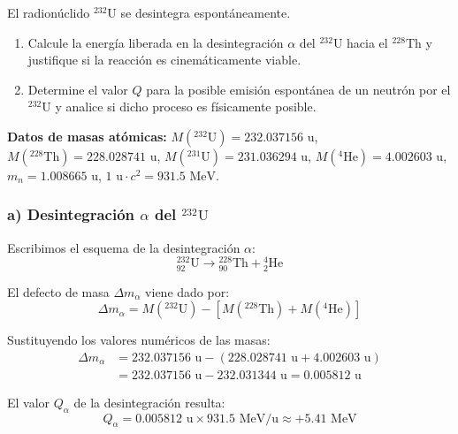 \begin{problema}
El radionúclido ${}^{232}\text{U}$ se desintegra espontáneamente.
\begin{enumerate}[label=\alph*)]
    \item Calcule la energía liberada en la desintegración $\alpha$ del ${}^{232}\text{U}$ hacia el ${}^{228}\text{Th}$ y justifique si la reacción es cinemáticamente viable.
    \item Determine el valor $Q$ para la posible emisión espontánea de un neutrón por el ${}^{232}\text{U}$ y analice si dicho proceso es físicamente posible.
\end{enumerate}

\textbf{Datos de masas atómicas:} $M({}^{232}\text{U}) = 232.037156\text{ u}$, $M({}^{228}\text{Th}) = 228.028741\text{ u}$, $M({}^{231}\text{U}) = 231.036294\text{ u}$, $M({}^4\text{He}) = 4.002603\text{ u}$, $m_n = 1.008665\text{ u}$, $1\text{ u} \cdot c^2 = 931.5\text{ MeV}$.

\tcblower

\subsubsection*{a) Desintegración $\alpha$ del ${}^{232}\text{U}$}

Escribimos el esquema de la desintegración $\alpha$:
\begin{equation}
{}_{92}^{232}\text{U} \longrightarrow {}_{90}^{228}\text{Th} + {}_2^4\text{He}
\end{equation}

El defecto de masa $\Delta m_\alpha$ viene dado por:
\begin{equation}
\Delta m_\alpha = M({}^{232}\text{U}) - \left[ M({}^{228}\text{Th}) + M({}^4\text{He}) \right]
\end{equation}

Sustituyendo los valores numéricos de las masas:
\begin{align}
\Delta m_\alpha &= 232.037156\text{ u} - (228.028741\text{ u} + 4.002603\text{ u}) \nonumber \\
&= 232.037156\text{ u} - 232.031344\text{ u} = 0.005812\text{ u}
\end{align}

El valor $Q_\alpha$ de la desintegración resulta:
\begin{equation}
Q_\alpha = 0.005812\text{ u} \times 931.5\text{ MeV/u} \approx +5.41\text{ MeV}
\end{equation}


\end{problema}
